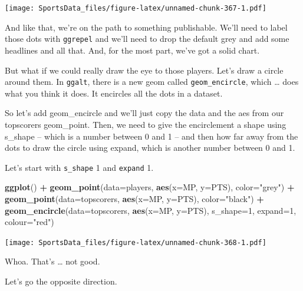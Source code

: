 \documentclass[
]{book}
\newenvironment{Shaded}{\begin{snugshade}}{\end{snugshade}}
\newcommand{\DataTypeTok}[1]{\textcolor[rgb]{0.13,0.29,0.53}{#1}}
\newcommand{\DecValTok}[1]{\textcolor[rgb]{0.00,0.00,0.81}{#1}}
\newcommand{\KeywordTok}[1]{\textcolor[rgb]{0.13,0.29,0.53}{\textbf{#1}}}
\newcommand{\NormalTok}[1]{#1}
\newcommand{\OperatorTok}[1]{\textcolor[rgb]{0.81,0.36,0.00}{\textbf{#1}}}
\newcommand{\StringTok}[1]{\textcolor[rgb]{0.31,0.60,0.02}{#1}}
\begin{document}
\texttt{[image: SportsData\_files/figure-latex/unnamed-chunk-367-1.pdf]}

And like that, we're on the path to something publishable. We'll need to label those dots with \texttt{ggrepel} and we'll need to drop the default grey and add some headlines and all that. And, for the most part, we've got a solid chart.

But what if we could really draw the eye to those players. Let's draw a circle around them.
In \texttt{ggalt}, there is a new geom called \texttt{geom\_encircle}, which \ldots{} does what you think it does. It encircles all the dots in a dataset.

So let's add geom\_encircle and we'll just copy the data and the aes from our topscorers geom\_point. Then, we need to give the encirclement a shape using s\_shape -- which is a number between 0 and 1 -- and then how far away from the dots to draw the circle using expand, which is another number between 0 and 1.

Let's start with \texttt{s\_shape} 1 and \texttt{expand} 1.

\begin{Shaded}
\begin{Highlighting}[]
\KeywordTok{ggplot}\NormalTok{() }\OperatorTok{+}\StringTok{ }
\StringTok{  }\KeywordTok{geom_point}\NormalTok{(}\DataTypeTok{data=}\NormalTok{players, }\KeywordTok{aes}\NormalTok{(}\DataTypeTok{x=}\NormalTok{MP, }\DataTypeTok{y=}\NormalTok{PTS), }\DataTypeTok{color=}\StringTok{"grey"}\NormalTok{) }\OperatorTok{+}\StringTok{ }
\StringTok{  }\KeywordTok{geom_point}\NormalTok{(}\DataTypeTok{data=}\NormalTok{topscorers, }\KeywordTok{aes}\NormalTok{(}\DataTypeTok{x=}\NormalTok{MP, }\DataTypeTok{y=}\NormalTok{PTS), }\DataTypeTok{color=}\StringTok{"black"}\NormalTok{) }\OperatorTok{+}\StringTok{ }
\StringTok{  }\KeywordTok{geom_encircle}\NormalTok{(}\DataTypeTok{data=}\NormalTok{topscorers, }\KeywordTok{aes}\NormalTok{(}\DataTypeTok{x=}\NormalTok{MP, }\DataTypeTok{y=}\NormalTok{PTS), }\DataTypeTok{s_shape=}\DecValTok{1}\NormalTok{, }\DataTypeTok{expand=}\DecValTok{1}\NormalTok{, }\DataTypeTok{colour=}\StringTok{"red"}\NormalTok{)}
\end{Highlighting}
\end{Shaded}

\texttt{[image: SportsData\_files/figure-latex/unnamed-chunk-368-1.pdf]}

Whoa. That's \ldots{} not good.

Let's go the opposite direction.
\end{document}
